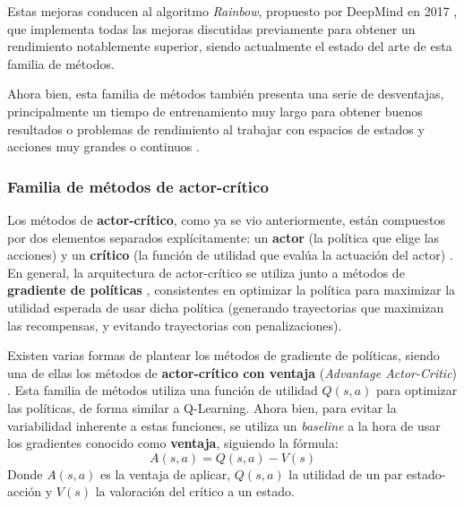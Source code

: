 Estas mejoras conducen al algoritmo \textit{Rainbow}, propuesto por DeepMind en 2017 \cite{DBLP:journals/corr/abs-1710-02298}, que implementa todas las mejoras discutidas previamente para obtener un rendimiento notablemente superior, siendo actualmente el estado del arte de esta familia de métodos.

Ahora bien, esta familia de métodos también presenta una serie de desventajas, principalmente un tiempo de entrenamiento muy largo para obtener buenos resultados \cite{10.5555/3161223} o problemas de rendimiento al trabajar con espacios de estados y acciones muy grandes o continuos \cite{DBLP:journals/corr/abs-1811-12560}.

\subsubsection{Familia de métodos de actor-crítico}

Los métodos de \textbf{actor-crítico}, como ya se vio anteriormente, están compuestos por dos elementos separados explícitamente: un \textbf{actor} (la política que elige las acciones) y un \textbf{crítico} (la función de utilidad que evalúa la actuación del actor) \cite{Sutton1998}. En general, la arquitectura de actor-crítico se utiliza junto a métodos de \textbf{gradiente de políticas} \cite{PETERS2008682}, consistentes en optimizar la política para maximizar la utilidad esperada de usar dicha política (generando trayectorias que maximizan las recompensas, y evitando trayectorias con penalizaciones). 

Existen varias formas de plantear los métodos de gradiente de políticas, siendo una de ellas los métodos de \textbf{actor-crítico con ventaja} (\textit{Advantage Actor-Critic}) \cite{DBLP:journals/corr/MnihBMGLHSK16}. Esta familia de métodos utiliza una función de utilidad $Q(s,a)$ para optimizar las políticas, de forma similar a Q-Learning. Ahora bien, para evitar la variabilidad inherente a estas funciones, se utiliza un \textit{baseline} a la hora de usar los gradientes conocido como \textbf{ventaja}, siguiendo la fórmula:
\[A(s,a)=Q(s,a)-V(s)\]
Donde $A(s,a)$ es la ventaja de aplicar, $Q(s,a)$ la utilidad de un par estado-acción y $V(s)$ la valoración del crítico a un estado.

